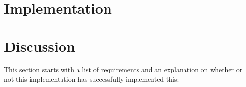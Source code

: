 \documentclass{article}
\begin{document}
\section{Implementation}
\paragraph{}

\section{Discussion}
\paragraph{}
This section starts with a list of requirements and an explanation on whether or not this implementation has successfully implemented this:
\end{document}
